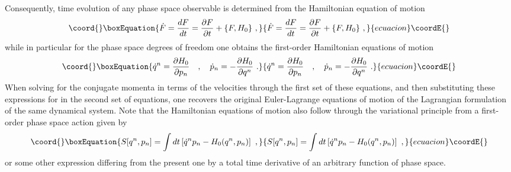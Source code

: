 \documentclass[a4paper,11pt]{article}
\begin{document}
Consequently, time evolution of any phase space observable \coordHE{}
is determined from the Hamiltonian equation of motion
\begin{equation}\coord{}\boxEquation{
\dot{F}=\frac{dF}{dt}=\frac{\partial F}{\partial t}+\{F,H_0\}\ ,
}{
\dot{F}=\frac{dF}{dt}=\frac{\partial F}{\partial t}+\{F,H_0\}\ ,
}{ecuacion}\coordE{}\end{equation}
while in particular for the phase space degrees of freedom one obtains
the first-order Hamiltonian equations of motion
\begin{equation}\coord{}\boxEquation{
\dot{q}^n=\frac{\partial H_0}{\partial p_n}\ \ \ ,\ \ \ 
\dot{p}_n=-\frac{\partial H_0}{\partial q^n}\ .
}{
\dot{q}^n=\frac{\partial H_0}{\partial p_n}\ \ \ ,\ \ \ 
\dot{p}_n=-\frac{\partial H_0}{\partial q^n}\ .
}{ecuacion}\coordE{}\end{equation}
When solving for the conjugate momenta \coordHE{} in terms of the velocities
\myHighlight{$\dot{q}^n$}\coordHE{} through the first set of these equations, and then substituting
these expressions for \myHighlight{$p_n$}\coordHE{} in the second set of equations, one recovers the
original Euler-Lagrange equations of motion of the Lagrangian formulation
of the same dynamical system. Note that the Hamiltonian equations
of motion also follow through the variational principle from a first-order
phase space action given by
\begin{equation}\coord{}\boxEquation{
S[q^n,p_n]=\int dt\left[\dot{q}^np_n-H_0(q^n,p_n)\right]\ ,
\label{eq:firstorderaction}
}{
S[q^n,p_n]=\int dt\left[\dot{q}^np_n-H_0(q^n,p_n)\right]\ ,
}{ecuacion}\coordE{}\end{equation}
or some other expression differing from the present one by a total
time derivative of an arbitrary function of phase space.
\end{document}
